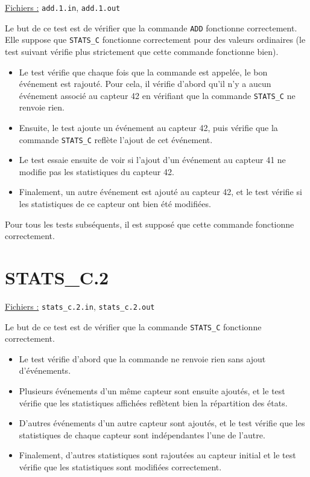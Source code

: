 \documentclass[11pt,a4paper]{article}
\begin{document}
\underline{Fichiers :} \texttt{add.1.in}, \texttt{add.1.out}

Le but de ce test est de vérifier que la commande \texttt{ADD} fonctionne correctement. Elle suppose que \texttt{STATS\_C} fonctionne correctement pour des valeurs ordinaires (le test suivant vérifie plus strictement que cette commande fonctionne bien).

\begin{itemize}
  \item Le test vérifie que chaque fois que la commande est appelée, le bon événement est rajouté. Pour cela, il vérifie d'abord qu'il n'y a aucun événement associé au capteur 42 en vérifiant que la commande \texttt{STATS\_C} ne renvoie rien.
  \item Ensuite, le test ajoute un événement au capteur 42, puis vérifie que la commande \texttt{STATS\_C} reflète l'ajout de cet événement.
  \item Le test essaie ensuite de voir si l'ajout d'un événement au capteur 41 ne modifie pas les statistiques du capteur 42.
  \item Finalement, un autre événement est ajouté au capteur 42, et le test vérifie si les statistiques de ce capteur ont bien été modifiées.
\end{itemize}

Pour tous les tests subséquents, il est supposé que cette commande fonctionne correctement.

\section*{STATS\_C.2}
\label{sec:STATS_C.2}

\underline{Fichiers :} \texttt{stats\_c.2.in}, \texttt{stats\_c.2.out}

Le but de ce test est de vérifier que la commande \texttt{STATS\_C} fonctionne correctement.

\begin{itemize}
  \item Le test vérifie d'abord que la commande ne renvoie rien sans ajout d'événements.
  \item Plusieurs événements d'un même capteur sont ensuite ajoutés, et le test vérifie que les statistiques affichées reflètent bien la répartition des états.
  \item D'autres événements d'un autre capteur sont ajoutés, et le test vérifie que les statistiques de chaque capteur sont indépendantes l'une de l'autre.
  \item Finalement, d'autres statistiques sont rajoutées au capteur initial et le test vérifie que les statistiques sont modifiées correctement.
\end{itemize}
\end{document}
